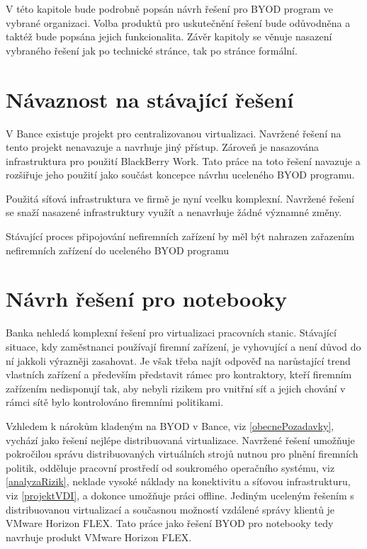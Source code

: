 
V této kapitole bude podrobně popsán návrh řešení pro BYOD program ve vybrané organizaci. Volba produktů pro uskutečnění řešení bude odůvodněna a taktéž bude popsána jejich funkcionalita. Závěr kapitoly se věnuje nasazení vybraného řešení jak po technické stránce, tak po stránce formální. 


\section{Návaznost na stávající řešení}

V Bance existuje projekt pro centralizovanou virtualizaci. Navržené řešení na tento projekt nenavazuje a navrhuje jiný přístup. Zároveň je nasazována infrastruktura pro použití BlackBerry Work. Tato práce na toto řešení navazuje a rozšiřuje jeho použití jako součást koncepce návrhu uceleného BYOD programu. 

Použitá síťová infrastruktura ve firmě je nyní vcelku komplexní. Navržené řešení se snaží nasazené infrastruktury využít a nenavrhuje žádné významné změny. 

Stávající proces připojování nefiremních zařízení by měl být nahrazen zařazením nefiremních zařízení do uceleného BYOD programu


\section{Návrh řešení pro notebooky}

Banka nehledá komplexní řešení pro virtualizaci pracovních stanic. Stávající situace, kdy zaměstnanci používají firemní zařízení, je vyhovující a není důvod do ní jakkoli výrazněji zasahovat. Je však třeba najít odpověď na narůstající trend vlastních zařízení a především představit rámec pro kontraktory, kteří firemním zařízením nedisponují tak, aby nebyli rizikem pro vnitřní síť a jejich chování v rámci sítě bylo kontrolováno firemními politikami.


Vzhledem k nárokům kladeným na BYOD v Bance, viz \ref{obecnePozadavky}, vychází jako řešení nejlépe distribuovaná virtualizace. Navržené řešení umožňuje pokročilou správu distribuovaných virtuálních strojů nutnou pro plnění firemních politik, odděluje pracovní prostředí od soukromého operačního systému, viz \ref{analyzaRizik}, neklade vysoké náklady na konektivitu a síťovou infrastrukturu, viz \ref{projektVDI}, a dokonce umožňuje práci offline. Jediným uceleným řešením s distribuovanou virtualizací a současnou možností vzdálené správy klientů je  VMware Horizon FLEX. Tato práce jako řešení BYOD pro notebooky tedy navrhuje produkt VMware Horizon FLEX.



